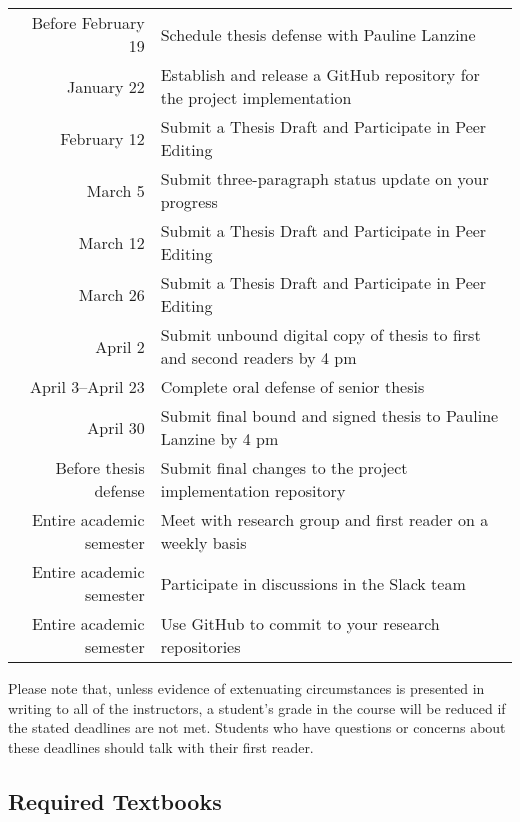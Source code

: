 \documentclass[11pt]{article}
\begin{document}
\begin{center}
\begin{tabular}{r|l}
\hline

Before February 19 & Schedule thesis defense with Pauline Lanzine \\
January 22  & Establish and release a GitHub repository for the project implementation \\
February 12 & Submit a Thesis Draft and Participate in Peer Editing  \\
March 5           & Submit three-paragraph status update on your progress \\
March 12 & Submit a Thesis Draft and Participate in Peer Editing \\ 
March 26 & Submit a Thesis Draft and Participate in Peer Editing \\ 
April 2            & Submit unbound digital copy of thesis to first and second readers by 4 pm \\
April 3--April 23  & Complete oral defense of senior thesis \\
April 30              & Submit final bound and signed thesis to Pauline Lanzine by 4 pm \\
Before thesis defense       & Submit final changes to the project implementation repository  \\

\hline
Entire academic semester & Meet with research group and first reader on a weekly basis \\
Entire academic semester & Participate in discussions in the Slack team \\
Entire academic semester & Use GitHub to commit to your research repositories \\
\hline
\end{tabular}
\end{center}


\noindent Please note that, unless evidence of extenuating circumstances is
presented in writing to all of the instructors, a student's grade in the course
will be reduced if the stated deadlines are not met. Students who have questions
or concerns about these deadlines should talk with their first reader.

\subsection*{Required Textbooks}
\end{document}
